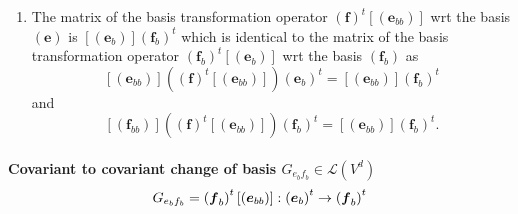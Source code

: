 \documentclass[aps,preprint]{revtex4}
\begin{document}
\begin{enumerate}
\begin{enumerate}
\item The matrix of the basis transformation operator $\left( \boldsymbol{f}%
\right) ^{t}\left[ \left( \boldsymbol{e}_{bb}\right) \right] $ wrt the basis 
$\left( \boldsymbol{e}\right) $ is $\left[ \left( \boldsymbol{e}_{b}\right) %
\right] \left( \boldsymbol{f}_{b}\right) ^{t}$ which is identical to the
matrix of the basis transformation operator $\left( \boldsymbol{f}%
_{b}\right) ^{t}\left[ \left( \boldsymbol{e}_{b}\right) \right] $ wrt the
basis $\left( \boldsymbol{f}_{b}\right) $ as 
\begin{equation}
\left[ \left( \boldsymbol{e}_{bb}\right) \right] \left( \overset{}{\left( 
\boldsymbol{f}\right) ^{t}\left[ \left( \boldsymbol{e}_{bb}\right) \right] }%
\right) \left( \boldsymbol{e}_{b}\right) ^{t}=\left[ \left( \boldsymbol{e}%
_{bb}\right) \right] \left( \boldsymbol{f}_{b}\right) ^{t}
\end{equation}%
and 
\begin{equation}
\left[ \left( \boldsymbol{f}_{bb}\right) \right] \left( \overset{}{\left( 
\boldsymbol{f}\right) ^{t}\left[ \left( \boldsymbol{e}_{bb}\right) \right] }%
\right) \left( \boldsymbol{f}_{b}\right) ^{t}=\left[ \left( \boldsymbol{e}%
_{bb}\right) \right] \left( \boldsymbol{f}_{b}\right) ^{t}.
\end{equation}
\end{enumerate}
\end{enumerate}

\paragraph{Covariant to covariant change of basis $G_{e_{b}f_{b}}\in 
\mathcal{L}\left( V^{d}\right) $ \label{Covariant to covariant change of
basis} 
\protect\begin{equation}
G_{e_{b}f_{b}}=\left( \boldsymbol{f}_{b}\right) ^{t}\left[ \left( 
\boldsymbol{e}_{bb}\right) \right] :\left( \boldsymbol{e}_{b}\right)
^{t}\rightarrow \left( \boldsymbol{f}_{b}\right) ^{t} 
\protect\end{equation}%
}
\end{document}
